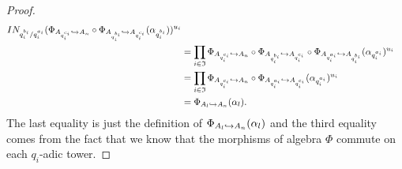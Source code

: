 \documentclass[a4paper,11pt]{article}
\begin{document}
\begin{proof}
\begin{align*}
{  I}N_{q_i^{b_i}/q_i^{a_i}}(\Phi_{A_{q_i^{c_i}}\hookrightarrow
A_n}\circ\Phi_{A_{q_i^{b_i}}\hookrightarrow A_{q_i^{c_i}}}
  (\alpha_{q_i^{b_i}}))^{u_i}\\
&= \prod_{i\in\mathfrak I}\Phi_{A_{q_i^{c_i}}\hookrightarrow
A_n}\circ\Phi_{A_{q_i^{b_i}}\hookrightarrow A_{q_i^{c_i}}}\circ\Phi_{A_{q_i^{a_i}}\hookrightarrow
A_{q_i^{b_i}}}(\alpha_{q_i^{a_i}})^{u_i}\\
&= \prod_{i\in\mathfrak I}\Phi_{A_{q_i^{c_i}}\hookrightarrow
A_n}\circ\Phi_{A_{q_i^{a_i}}\hookrightarrow A_{q_i^{c_i}}}(\alpha_{q_i^{a_i}})^{u_i}\\
&= \Phi_{A_l\hookrightarrow A_n}(\alpha_l).
  \end{align*}
  The last equality is just the definition of $\Phi_{A_l\hookrightarrow A_n}(\alpha_l)$ and
  the third equality comes from the fact that we know that the morphisms of algebra
  $\Phi$ commute on each $q_i$-adic tower.
\end{proof}
\end{document}
